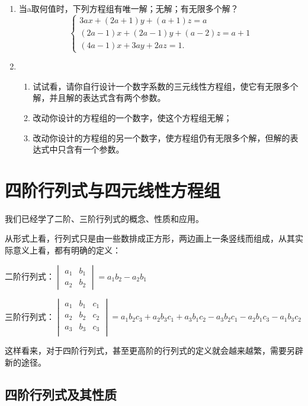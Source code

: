 \begin{enumerate}
\item 当a取何值时，下列方程组有唯一解；无解；有无限多个解？
\[\begin{cases}
    3ax+ (2a+1) y+ (a+1) z=a\\
    (2a-1) x+ (2a-1) y+ (a-2) z=a+1\\
    (4a-1) x+3ay+2az=1.
\end{cases}\]

\item \begin{enumerate}
    \item 试试看，请你自行设计一个数字系数的三元线性方程组，使它有无限多个解，并且解的表达式含有两个参数。
    \item 改动你设计的方程组的一个数字，使这个方程组无解；
    \item 改动你设计的方程组的另一个数字，使方程组仍有无限多个解，但解的表达式中只含有一个参数。
\end{enumerate}
\end{enumerate}


\section{四阶行列式与四元线性方程组}

我们已经学了二阶、三阶行列式的概念、性质和应用。

从形式上看，行列式只是由一些数排成正方形，两边画上一条竖线而组成，从其实际意义上看，都有明确的定义：

二阶行列式：$\begin{vmatrix}
    a_1&b_1\\a_2&b_2
\end{vmatrix}=a_1b_2-a_2b_1$

三阶行列式：$\begin{vmatrix}
a_1&b_1&c_1\\a_2&b_2&c_2\\a_3&b_3&c_3\\
\end{vmatrix}=a_1b_2c_3+a_2b_3c_1+a_3b_1c_2-a_3b_2c_1-a_2b_1c_3-a_1b_3c_2$

这样看来，对于四阶行列式，甚至更高阶的行列式的定义就会越来越繁，需要另辟新的途径。

\subsection{四阶行列式及其性质}

